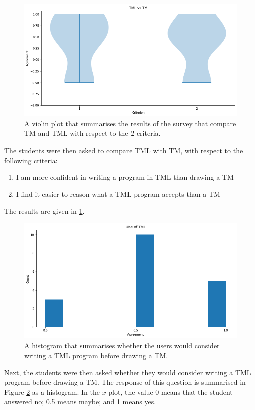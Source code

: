 \begin{appendices}
\begin{figure}[htb]
    \centering
    \includegraphics[scale=0.35]{images/tml-v-tm.png}
    \caption{A violin plot that summarises the results of the survey that compare TM and TML with respect to the 2 criteria.}
    \label{fig:tml-v-tm}
\end{figure}
The students were then asked to compare TML with TM, with respect to the following criteria:
\begin{enumerate}
    \item I am more confident in writing a program in TML than drawing a TM
    \item I find it easier to reason what a TML program accepts than a TM
\end{enumerate}
The results are given in \ref{fig:tml-v-tm}.

\begin{figure}[htb]
    \centering
    \includegraphics[scale=0.35]{images/use-tml.png}
    \caption{A histogram that summarises whether the users would consider writing a TML program before drawing a TM.}
    \label{fig:use-tml}
\end{figure}
Next, the students were then asked whether they would consider writing a TML program before drawing a TM. The response of this question is summarised in Figure \ref{fig:use-tml} as a histogram. In the $x$-plot, the value 0 means that the student answered no; 0.5 means maybe; and 1 means yes.


\end{appendices}
